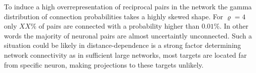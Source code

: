 


To induce a high overrepresentation of reciprocal pairs in the network
the gamma distribution of connection probabilities takes a highly
skewed shape. For $\varrho = 4$ only $XX\%$ of pairs are connected
with a probability higher than $0.01\%$. In other words the majority
of neuronal pairs are almost uncertaintly unconnected. Such a
situation could be likely in distance-dependence is a strong factor
determining network connectivity as in sufficient large networks, most
targets are located far from specific neuron, making projections to
these targets unlikely.
